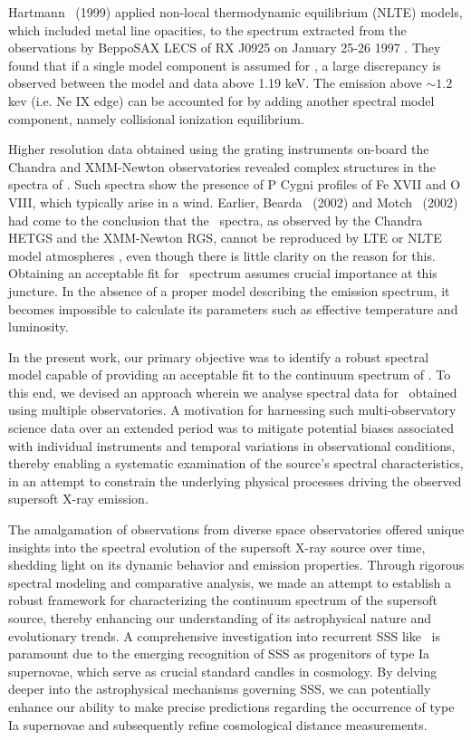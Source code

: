 		Hartmann \etal\ (1999) applied non-local thermodynamic equilibrium (NLTE) models, which included metal line opacities, to the spectrum extracted from the observations by BeppoSAX LECS of RX J0925 on January 25-26 1997 \cite{hartmann1999constraining}. They found that if a single model component is assumed for \source, a large discrepancy is observed between the model and data above 1.19 keV. The emission above $\sim 1.2$ kev (i.e. Ne IX edge) can be accounted for by adding another spectral model component, namely collisional ionization equilibrium.
		
		Higher resolution data obtained using the grating instruments on-board the Chandra and XMM-Newton observatories revealed complex structures in the spectra of \source. Such spectra show the presence of P Cygni profiles of Fe XVII and O VIII, which typically arise in a wind. Earlier, Bearda \etal\ (2002) and Motch \etal\ (2002) had come to the conclusion that the \source\ spectra, as observed by the Chandra HETGS and the XMM-Newton RGS, cannot be reproduced by LTE or NLTE model atmospheres \cite{beardaChandra2002AA,motchXmmNewton2002AA}, even though there is little clarity on the reason for this. Obtaining an acceptable fit for \source\ spectrum assumes crucial importance at this juncture. In the absence of a proper model describing the emission spectrum, it becomes impossible to calculate its parameters such as effective temperature and luminosity.
		
		In the present work, our primary objective was to identify a robust spectral model capable of providing an acceptable fit to the continuum spectrum of \source. To this end, we devised an approach wherein we analyse spectral data for \source\ obtained using multiple observatories. A motivation for harnessing such multi-observatory science data over an extended period was to mitigate potential biases associated with individual instruments and temporal variations in observational conditions, thereby enabling a systematic examination of the source's spectral characteristics, in an attempt to constrain the underlying physical processes driving the observed supersoft X-ray emission.
		
		The amalgamation of observations from diverse space observatories offered unique insights into the spectral evolution of the supersoft X-ray source over time, shedding light on its dynamic behavior and emission properties. Through rigorous spectral modeling and comparative analysis, we made an attempt to establish a robust framework for characterizing the continuum spectrum of the supersoft source, thereby enhancing our understanding of its astrophysical nature and evolutionary trends. A comprehensive investigation into recurrent SSS like \source\ is paramount due to the emerging recognition of SSS as progenitors of type Ia supernovae, which serve as crucial standard candles in cosmology. By delving deeper into the astrophysical mechanisms governing SSS, we can potentially enhance our ability to make precise predictions regarding the occurrence of type Ia supernovae and subsequently refine cosmological distance measurements.
    
